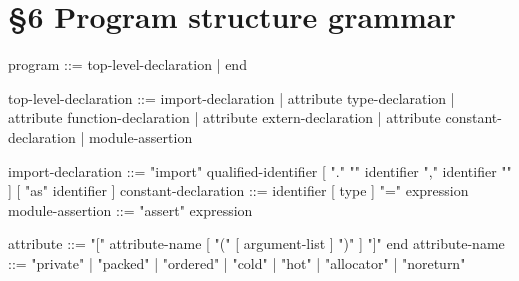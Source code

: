 \section*{§6 Program structure grammar}
\label{gram:program}\label{gram:import-declaration}
\begin{grammar}
program               ::= { top-level-declaration | end }

top-level-declaration ::=
    import-declaration
  | { attribute } type-declaration
  | { attribute } function-declaration
  | { attribute } extern-declaration
  | { attribute } constant-declaration
  | module-assertion

import-declaration    ::= "import" qualified-identifier
                          [ "." "{" identifier { "," identifier } "}" ]
                          [ "as" identifier ]
constant-declaration  ::= identifier [ type ] "=" expression     %
module-assertion      ::= "assert" expression             %

attribute             ::= "[" attribute-name [ "(" [ argument-list ] ")" ] "]" { end }
attribute-name        ::= "private" | "packed" | "ordered"
                        | "cold" | "hot" | "allocator" | "noreturn"
\end{grammar}


